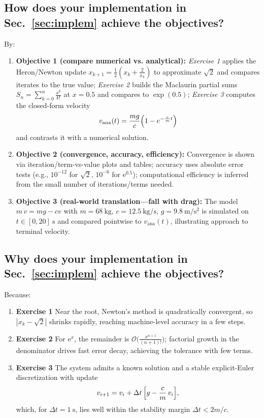 \subsection{How does your implementation in Sec.~\ref{sec:implem} achieve the objectives?}
By:
\begin{enumerate}
  \item \textbf{Objective 1 (compare numerical vs. analytical):} 
  \emph{Exercise 1} applies the Heron/Newton update 
  \(x_{k+1}=\tfrac12\!\left(x_k+\tfrac{2}{x_k}\right)\) to approximate \(\sqrt{2}\) and
  compares iterates to the true value; \emph{Exercise 2} builds the Maclaurin partial sums
  \(S_n=\sum_{k=0}^{n}\tfrac{x^{k}}{k!}\) at \(x=0.5\) and compares to \(\exp(0.5)\);
  \emph{Exercise 3} computes the closed-form velocity
  \[
    v_{\mathrm{ana}}(t)=\frac{mg}{c}\Bigl(1-e^{-\frac{c}{m}t}\Bigr)
  \]
  and contrasts it with a numerical solution.
  \item \textbf{Objective 2 (convergence, accuracy, efficiency):}
  Convergence is shown via iteration/term-vs-value plots and tables; accuracy uses absolute
  error tests (e.g., \(10^{-12}\) for \(\sqrt{2}\), \(10^{-6}\) for \(\mathrm{e}^{0.5}\));
  computational efficiency is inferred from the small number of iterations/terms needed.
  \item \textbf{Objective 3 (real-world translation—fall with drag):}
  The model \(m\,\dot v=mg-cv\) with \(m=68~\mathrm{kg}\), \(c=12.5~\mathrm{kg/s}\),
  \(g=9.8~\mathrm{m/s^2}\) is simulated on \(t\in[0,20]~\mathrm{s}\) and compared pointwise
  to \(v_{\mathrm{ana}}(t)\), illustrating approach to terminal velocity.
\end{enumerate}
	
\subsection{Why does your implementation in Sec.~\ref{sec:implem} achieve the objectives?}
Because:
\begin{enumerate}
  \item \textbf{Exercise 1} Near the root, Newton’s method is quadratically convergent,
  so \(|x_{k}-\sqrt{2}|\) shrinks rapidly, reaching machine-level accuracy in a few steps.
  \item \textbf{Exercise 2} For \(\mathrm{e}^x\), the remainder is
  \(\mathcal{O}\!\bigl(\tfrac{x^{n+1}}{(n+1)!}\bigr)\); factorial growth in the denominator drives
  fast error decay, achieving the tolerance with few terms.
  \item \textbf{Exercise 3} The system admits a known solution and a stable
  explicit-Euler discretization with update
  \[
    v_{i+1}=v_i+\Delta t\,\Bigl[g-\frac{c}{m}\,v_i\Bigr],
  \]
  which, for \(\Delta t=1~\mathrm{s}\), lies well within the stability margin \(\Delta t<2m/c\).
\end{enumerate}
	
